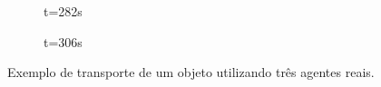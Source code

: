 \begin{figure}[htpb]
  \begin{subfigure}[t]{0.45\textwidth}
    \centering
    \caption{t=282s}
    \label{fig:real_9}
  \end{subfigure}
  \hspace{0.2cm}
  \begin{subfigure}[t]{0.45\textwidth}
    \centering
    \caption{t=306s}
    \label{fig:real_10}
  \end{subfigure}

  \caption{Exemplo de transporte de um objeto utilizando três agentes reais.}
  \label{fig:real}

\end{figure}


